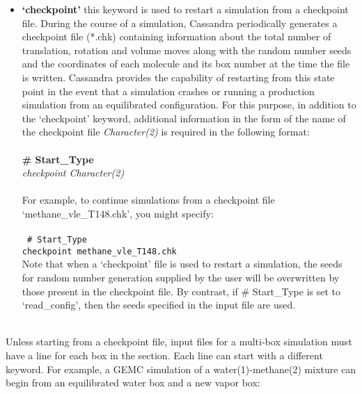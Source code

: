 \begin{itemize}
\item \textbf{`checkpoint'} this keyword is used to restart a simulation from a checkpoint file.
During the course of a simulation, Cassandra periodically generates a checkpoint file (*.chk)
 containing information about the total number of translation, rotation and volume moves along with the random number seeds and 
the coordinates of each molecule and its box number at the time the file is written. Cassandra provides
the capability of restarting from this state point in the event that a simulation crashes or 
running a production simulation from an equilibrated configuration. For this
purpose, in addition to the `checkpoint' keyword, additional information in the form of the name of 
the checkpoint file {\it Character(2)} is required in the following format: \\ \\
%
{\bf \# Start\_Type} \\
{\it checkpoint Character(2)} \\ \\
%
For example, to continue simulations from a checkpoint file `methane\_vle\_T148.chk', you might specify: \\ \\
%
\texttt{
\# Start\_Type \\
checkpoint methane\_vle\_T148.chk \\ }
%
Note that when a `checkpoint' file is used to restart a simulation, the seeds for random number generation supplied by the user
will be overwritten by those present in the checkpoint file. By contrast, if \# Start\_Type is set to `read\_config', 
then the seeds specified in the input file are used.  \\ \\
%
\end{itemize}
Unless starting from a checkpoint file, input files for a multi-box simulation must have a line for each box in the  section. Each line can start with a different keyword. For example, a GEMC simulation of a water(1)-methane(2) mixture can begin from an equilibrated water box and a new vapor box:
%
%
%
%
